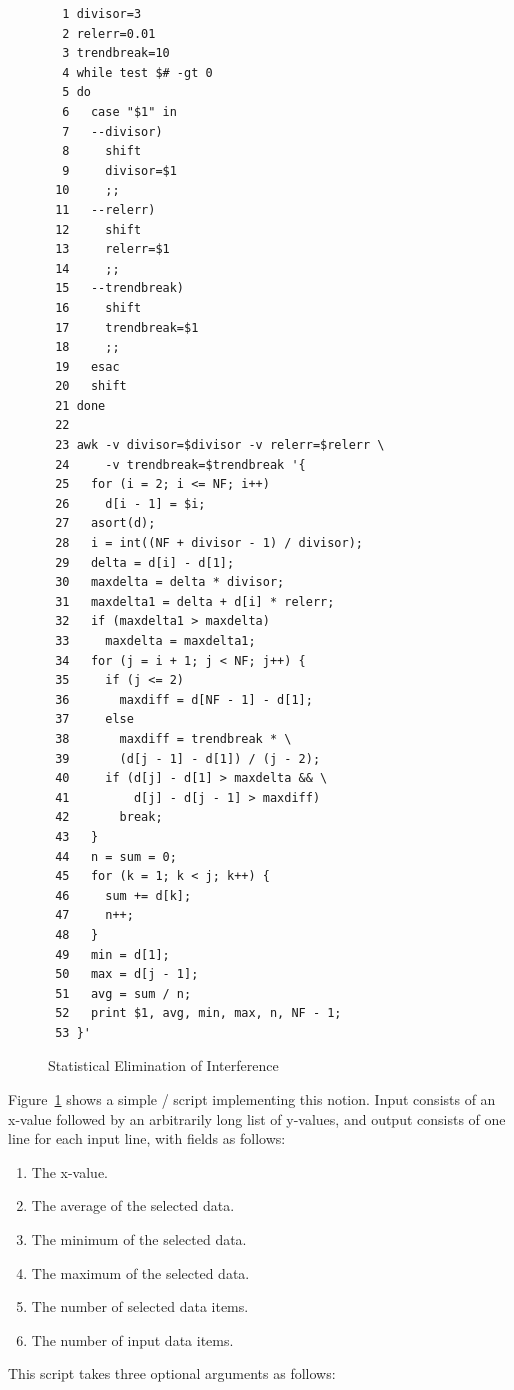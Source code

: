 \begin{figure}[tb]
{ \scriptsize
\begin{verbatim}
  1 divisor=3
  2 relerr=0.01
  3 trendbreak=10
  4 while test $# -gt 0
  5 do
  6   case "$1" in
  7   --divisor)
  8     shift
  9     divisor=$1
 10     ;;
 11   --relerr)
 12     shift
 13     relerr=$1
 14     ;;
 15   --trendbreak)
 16     shift
 17     trendbreak=$1
 18     ;;
 19   esac
 20   shift
 21 done
 22 
 23 awk -v divisor=$divisor -v relerr=$relerr \
 24     -v trendbreak=$trendbreak '{
 25   for (i = 2; i <= NF; i++)
 26     d[i - 1] = $i;
 27   asort(d);
 28   i = int((NF + divisor - 1) / divisor);
 29   delta = d[i] - d[1];
 30   maxdelta = delta * divisor;
 31   maxdelta1 = delta + d[i] * relerr;
 32   if (maxdelta1 > maxdelta)
 33     maxdelta = maxdelta1;
 34   for (j = i + 1; j < NF; j++) {
 35     if (j <= 2)
 36       maxdiff = d[NF - 1] - d[1];
 37     else
 38       maxdiff = trendbreak * \
 39       (d[j - 1] - d[1]) / (j - 2);
 40     if (d[j] - d[1] > maxdelta && \
 41         d[j] - d[j - 1] > maxdiff)
 42       break;
 43   }
 44   n = sum = 0;
 45   for (k = 1; k < j; k++) {
 46     sum += d[k];
 47     n++;
 48   }
 49   min = d[1];
 50   max = d[j - 1];
 51   avg = sum / n;
 52   print $1, avg, min, max, n, NF - 1;
 53 }'
\end{verbatim}
}
\caption{Statistical Elimination of Interference}
\label{fig:count:Statistical Elimination of Interference}
\end{figure}

Figure~\ref{fig:count:Statistical Elimination of Interference}
shows a simple / script implementing this notion.
Input consists of an x-value followed by an arbitrarily long list of y-values,
and output consists of one line for each input line, with fields as follows:

\begin{enumerate}
\item	The x-value.
\item	The average of the selected data.
\item	The minimum of the selected data.
\item	The maximum of the selected data.
\item	The number of selected data items.
\item	The number of input data items.
\end{enumerate}

This script takes three optional arguments as follows:

